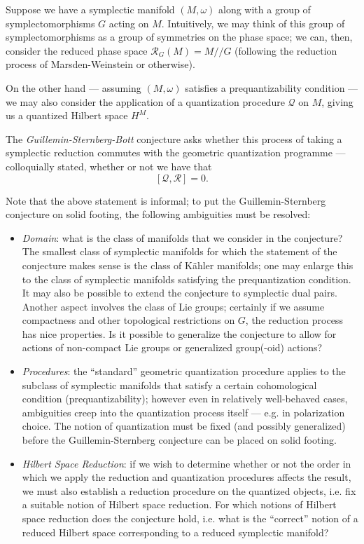 Suppose we have a symplectic manifold $(M,\omega)$ along with a group of symplectomorphisms $G$ acting on $M$. Intuitively, we may think of this group of symplectomorphisms as a group of symmetries on the phase space; we can, then, consider the reduced phase space $\mathcal{R}_G(M) = M // G$ (following the reduction process of Marsden-Weinstein or otherwise).

On the other hand --- assuming $(M,\omega)$ satisfies a prequantizability condition --- we may also consider the application of a quantization procedure $\mathcal{Q}$ on $M$, giving us a quantized Hilbert space $H^M$.

The \emph{Guillemin-Sternberg-Bott} conjecture asks whether this process of taking a symplectic reduction commutes with the geometric quantization programme --- colloquially stated, whether or not we have that
$$
[\mathcal{Q}, \mathcal{R}] = 0.
$$

Note that the above statement is informal; to put the Guillemin-Sternberg conjecture on solid footing, the following ambiguities must be resolved:

\begin{itemize}
\item \emph{Domain}: what is the class of manifolds that we consider in the conjecture? The smallest class of symplectic manifolds for which the statement of the conjecture makes sense is the class of K\"{a}hler manifolds; one may enlarge this to the class of symplectic manifolds satisfying the prequantization condition. It may also be possible to extend the conjecture to symplectic dual pairs. Another aspect involves the class of Lie groups; certainly if we assume compactness and other topological restrictions on $G$, the reduction process has nice properties. Is it possible to generalize the conjecture to allow for actions of non-compact Lie groups or generalized group(-oid) actions?

\item \emph{Procedures}: the ``standard'' geometric quantization procedure applies to the subclass of symplectic manifolds that satisfy a certain cohomological condition (prequantizability); however even in relatively well-behaved cases, ambiguities creep into the quantization process itself --- e.g. in polarization choice. The notion of quantization must be fixed (and possibly generalized) before the Guillemin-Sternberg conjecture can be placed on solid footing.

\item \emph{Hilbert Space Reduction}: if we wish to determine whether or not the order in which we apply the reduction and quantization procedures affects the result, we must also establish a reduction procedure on the quantized objects, i.e. fix a suitable notion of Hilbert space reduction. For which notions of Hilbert space reduction does the conjecture hold, i.e. what is the ``correct'' notion of a reduced Hilbert space corresponding to a reduced symplectic manifold?

\end{itemize}

